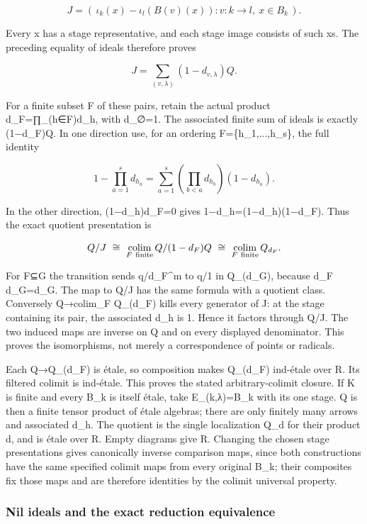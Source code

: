 \[
J=(\,\iota_k(x)-\iota_l(B(v)(x)):
                    v:k\to l,\ x\in B_k\,).
\]

Every x has a stage representative, and each stage image consists of such x\textquotesingle s. The preceding equality of ideals therefore proves

\[
J=\sum_{(v,\lambda)}(1-d_{v,\lambda})Q.
\]

For a finite subset F of these pairs, retain the actual product d\_F=∏\_(h∈F)d\_h, with d\_∅=1. The associated finite sum of ideals is exactly (1−d\_F)Q. In one direction use, for an ordering F=\{h\_1,...,h\_s\}, the full identity

\[
1-\prod_{a=1}^s d_{h_a}
 =\sum_{a=1}^s\left(\prod_{b<a}d_{h_b}\right)(1-d_{h_a}).
\]

In the other direction, (1−d\_h)d\_F=0 gives 1−d\_h=(1−d\_h)(1−d\_F). Thus the exact quotient presentation is

\[
Q/J\ \cong\ \mathop{\rm colim}_{F\ {\rm finite}}
     Q/(1-d_F)Q
\ \cong\ \mathop{\rm colim}_{F\ {\rm finite}} Q_{d_F}.
\]

For F⊆G the transition sends q/d\_F\^{}m to q/1 in Q\_(d\_G), because d\_F d\_G=d\_G. The map to Q/J has the same formula with a quotient class. Conversely Q→colim\_F Q\_(d\_F) kills every generator of J: at the stage containing its pair, the associated d\_h is 1. Hence it factors through Q/J. The two induced maps are inverse on Q and on every displayed denominator. This proves the isomorphisms, not merely a correspondence of points or radicals.

Each Q→Q\_(d\_F) is étale, so composition makes Q\_(d\_F) ind-étale over R. Its filtered colimit is ind-étale. This proves the stated arbitrary-colimit closure. If K is finite and every B\_k is itself étale, take E\_(k,λ)=B\_k with its one stage. Q is then a finite tensor product of étale algebras; there are only finitely many arrows and associated d\_h. The quotient is the single localization Q\_d for their product d, and is étale over R. Empty diagrams give R. Changing the chosen stage presentations gives canonically inverse comparison maps, since both constructions have the same specified colimit maps from every original B\_k; their composites fix those maps and are therefore identities by the colimit universal property.

\subsubsection{Nil ideals and the exact reduction equivalence}\label{algebra-proof-059-nil-ideals-and-the-exact-reduction-equivalence}

